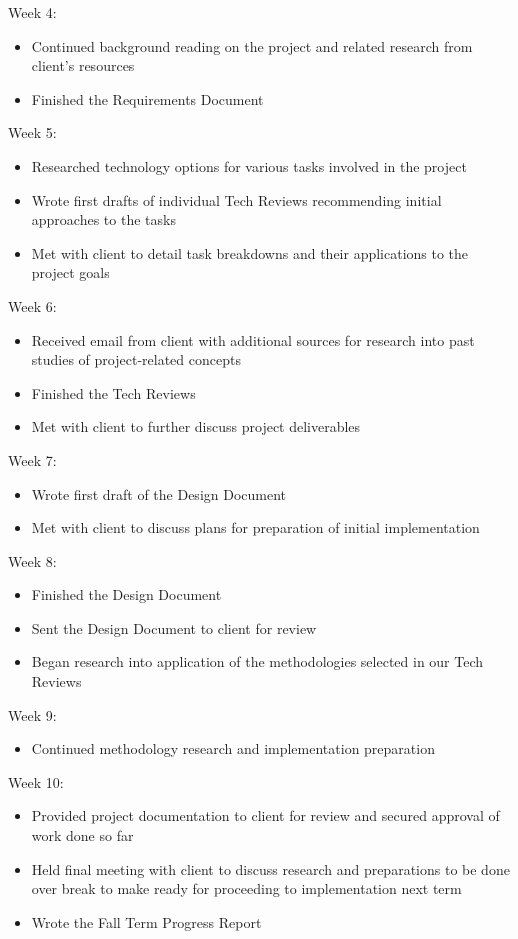 \documentclass[onecolumn, draftclsnofoot,10pt, compsoc]{IEEEtran}
\begin{document}
Week 4:
\begin{itemize}
\item Continued background reading on the project and related research from client's resources
\item Finished the Requirements Document
\end{itemize}

Week 5:
\begin{itemize}
\item Researched technology options for various tasks involved in the project
\item Wrote first drafts of individual Tech Reviews recommending initial approaches to the tasks
\item Met with client to detail task breakdowns and their applications to the project goals
\end{itemize}

Week 6:
\begin{itemize}
\item Received email from client with additional sources for research into past studies of project-related concepts
\item Finished the Tech Reviews
\item Met with client to further discuss project deliverables
\end{itemize}

Week 7:
\begin{itemize}
\item Wrote first draft of the Design Document
\item Met with client to discuss plans for preparation of initial implementation
\end{itemize}

Week 8:
\begin{itemize}
\item Finished the Design Document
\item Sent the Design Document to client for review
\item Began research into application of the methodologies selected in our Tech Reviews
\end{itemize}

Week 9:
\begin{itemize}
\item Continued methodology research and implementation preparation
\end{itemize}

Week 10:
\begin{itemize}
\item Provided project documentation to client for review and secured approval of work done so far
\item Held final meeting with client to discuss research and preparations to be done over break to make ready for proceeding to implementation next term
\item Wrote the Fall Term Progress Report
\end{itemize}
\end{document}
